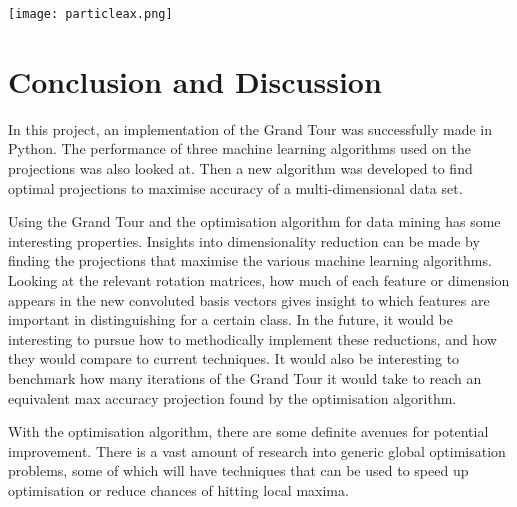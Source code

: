 \documentclass[a4paper,11pt,twoside]{article}
\begin{document}
\begin{center}
\texttt{[image: particleax.png]}

\end{center}

\newpage
\section{Conclusion and Discussion}

In this project, an implementation of the Grand Tour was successfully made in Python. The performance of three machine learning algorithms used on the projections was also looked at. Then a new algorithm was developed to find optimal projections to maximise accuracy of a multi-dimensional data set.
\newline

Using the Grand Tour and the optimisation algorithm for data mining has some interesting properties. Insights into dimensionality reduction can be made by finding the projections that maximise the various machine learning algorithms. Looking at the relevant rotation matrices, how much of each feature or dimension appears in the new convoluted basis vectors gives insight to which features are important in distinguishing for a certain class. In the future, it would be interesting to pursue how to methodically implement these reductions, and how they would compare to current techniques. It would also be interesting to benchmark how many iterations of the Grand Tour it would take to reach an equivalent max accuracy projection found by the optimisation algorithm.
\newline

With the optimisation algorithm, there are some definite avenues for potential improvement. There is a vast amount of research into generic global optimisation problems, some of which will have techniques that can be used to speed up optimisation or reduce chances of hitting local maxima.
\newline
\end{document}
